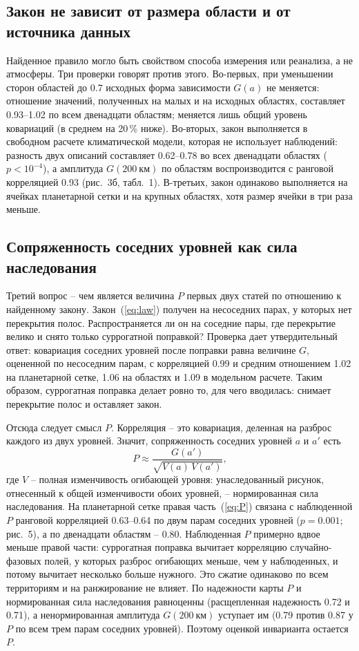\documentclass[12pt,a4paper]{article}
\begin{document}
\subsection{Закон не зависит от размера области и от источника данных}

Найденное правило могло быть свойством способа измерения или реанализа, а не атмосферы. Три проверки говорят против этого. Во-первых, при уменьшении сторон областей до 0.7 исходных форма зависимости $G(a)$ не меняется: отношение значений, полученных на малых и на исходных областях, составляет 0.93--1.02 по всем двенадцати областям; меняется лишь общий уровень ковариаций (в среднем на 20\,\% ниже). Во-вторых, закон выполняется в свободном расчете климатической модели, которая не использует наблюдений: разность двух описаний составляет 0.62--0.78 во всех двенадцати областях ($p < 10^{-4}$), а амплитуда $G(200~\text{км})$ по областям воспроизводится с ранговой корреляцией 0.93 (рис.~3б, табл.~1). В-третьих, закон одинаково выполняется на ячейках планетарной сетки и на крупных областях, хотя размер ячейки в три раза меньше.

\subsection{Сопряженность соседних уровней как сила наследования}

Третий вопрос -- чем является величина $P$ первых двух статей по отношению к найденному закону. Закон~(\ref{eq:law}) получен на несоседних парах, у которых нет перекрытия полос. Распространяется ли он на соседние пары, где перекрытие велико и снято только суррогатной поправкой? Проверка дает утвердительный ответ: ковариация соседних уровней после поправки равна величине $G$, оцененной по несоседним парам, с корреляцией 0.99 и средним отношением 1.02 на планетарной сетке, 1.06 на областях и 1.09 в модельном расчете. Таким образом, суррогатная поправка делает ровно то, для чего вводилась: снимает перекрытие полос и оставляет закон.

Отсюда следует смысл $P$. Корреляция -- это ковариация, деленная на разброс каждого из двух уровней. Значит, сопряженность соседних уровней $a$ и $a'$ есть
\begin{equation}
P \approx \frac{G(a')}{\sqrt{V(a)\,V(a')}},
\label{eq:P}
\end{equation}
где $V$ -- полная изменчивость огибающей уровня: унаследованный рисунок, отнесенный к общей изменчивости обоих уровней, -- нормированная сила наследования. На планетарной сетке правая часть~(\ref{eq:P}) связана с наблюденной $P$ ранговой корреляцией 0.63--0.64 по двум парам соседних уровней ($p = 0.001$; рис.~5), а по двенадцати областям -- 0.80. Наблюденная $P$ примерно вдвое меньше правой части: суррогатная поправка вычитает корреляцию случайно-фазовых полей, у которых разброс огибающих меньше, чем у наблюденных, и потому вычитает несколько больше нужного. Это сжатие одинаково по всем территориям и на ранжирование не влияет. По надежности карты $P$ и нормированная сила наследования равноценны (расщепленная надежность 0.72 и 0.71), а ненормированная амплитуда $G(200~\text{км})$ уступает им (0.79 против 0.87 у $P$ по всем трем парам соседних уровней). Поэтому оценкой инварианта остается $P$.
\end{document}
